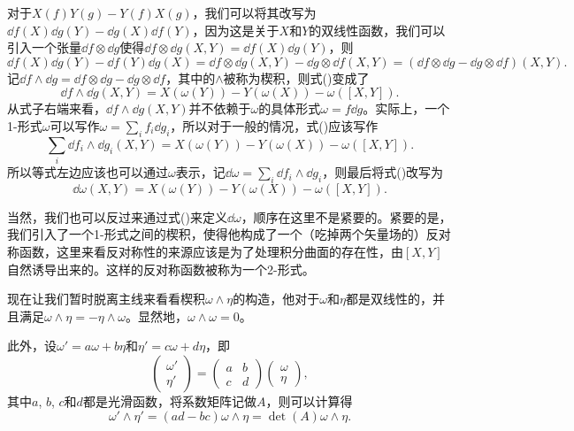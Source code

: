 对于$X(f)Y(g)-Y(f)X(g)$，我们可以将其改写为$\dd f(X)\dd g(Y)-\dd g(X)\dd f(Y)$，因为这是关于$X$和$Y$的双线性函数，我们可以引入一个张量$\dd f\otimes \dd g$使得$\dd f\otimes \dd g(X,Y)=\dd f(X)\dd g(Y)$，则
\[
	\dd f(X)\dd g(Y)-\dd f(Y)\dd g(X)=\dd f\otimes \dd g(X,Y)-\dd g\otimes \dd f(X,Y)=(\dd f\otimes \dd g-\dd g\otimes \dd f)(X,Y).
\]
记$\dd f\wedge \dd g=\dd f\otimes \dd g-\dd g\otimes \dd f$，其中的$\wedge$被称为楔积，则式(\theequation)变成了
\[
	\dd f\wedge \dd g(X,Y)=X(\omega(Y))-Y(\omega(X))-\omega([X,Y]).
\]
从式子右端来看，$\dd f\wedge \dd g(X,Y)$并不依赖于$\omega$的具体形式$\omega=f\dd g$。实际上，一个1-形式$\omega$可以写作$\omega=\sum_i f_i\dd g_i$，所以对于一般的情况，式(\theequation)应该写作
\[
	\sum_i\dd f_i\wedge \dd g_i(X,Y)=X(\omega(Y))-Y(\omega(X))-\omega([X,Y]).
\]
所以等式左边应该也可以通过$\omega$表示，记$\dd \omega = \sum_i\dd f_i\wedge \dd g_i$，则最后将式(\theequation)改写为
\begin{equation}
	\dd \omega (X,Y)=X(\omega(Y))-Y(\omega(X))-\omega([X,Y]).
\end{equation}

当然，我们也可以反过来通过式(\theequation)来定义$\dd \omega$，顺序在这里不是紧要的。紧要的是，我们引入了一个1-形式之间的楔积，使得他构成了一个（吃掉两个矢量场的）反对称函数，这里来看反对称性的来源应该是为了处理积分曲面的存在性，由$[X,Y]$自然诱导出来的。这样的反对称函数被称为一个2-形式。




\para 现在让我们暂时脱离主线来看看楔积$\omega\wedge \eta$的构造，他对于$\omega$和$\eta$都是双线性的，并且满足$\omega\wedge \eta=-\eta\wedge \omega$。显然地，$\omega\wedge\omega=0$。

此外，设$\omega'=a\omega+b\eta$和$\eta'=c\omega+d\eta$，即
\[
	\begin{pmatrix}
	\omega'\\
	\eta'
	\end{pmatrix}=\begin{pmatrix}
	a&b\\
	c&d
	\end{pmatrix}\begin{pmatrix}
	\omega\\
	\eta
	\end{pmatrix},
\]
其中$a$, $b$, $c$和$d$都是光滑函数，将系数矩阵记做$A$，则可以计算得
\[
	\omega'\wedge \eta'=(ad-bc)\omega\wedge \eta=\det(A)\omega\wedge \eta.
\]

